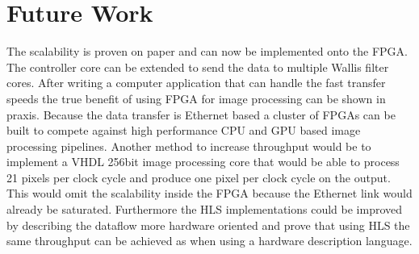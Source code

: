 \section{Future Work}
The scalability is proven on paper and can now be implemented onto the FPGA.
The controller core can be extended to send the data to multiple Wallis filter
cores. After writing a computer application that can handle the fast transfer
speeds the true benefit of using FPGA for image processing can be shown in
praxis. Because the data transfer is Ethernet based a cluster of FPGAs can be
built to compete against high performance CPU and GPU based image processing
pipelines. Another method to increase throughput would be to implement a VHDL
256bit image processing core that would be able to process 21 pixels per clock
cycle and produce one pixel per clock cycle on the output. This would omit the
scalability inside the FPGA because the Ethernet link would already be
saturated. Furthermore the HLS implementations could be improved by describing
the dataflow more hardware oriented and prove that using HLS the same
throughput can be achieved as when using a hardware description language.

